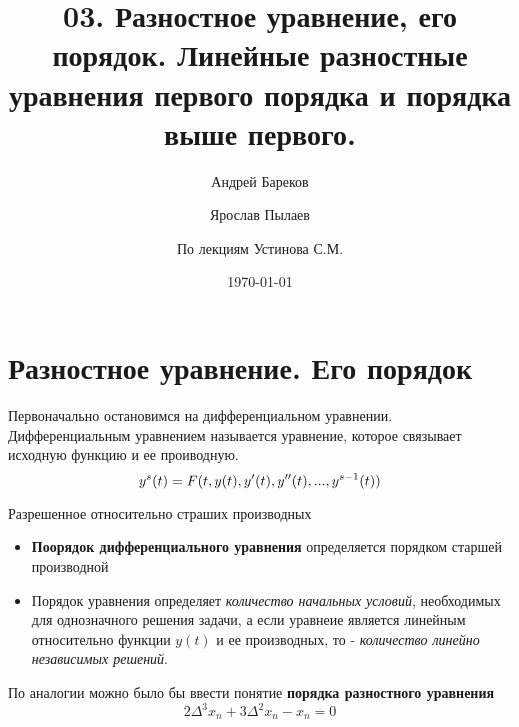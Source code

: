\documentclass[a4paper,11pt]{article}
\title{03. Разностное уравнение, его порядок. Линейные разностные уравнения первого порядка и порядка выше первого.}
\author{Андрей Бареков \and Ярослав Пылаев \and По лекциям Устинова С.М.}
\date{\today}
\begin{document}
\maketitle
\newpage

\section{Разностное уравнение. Его порядок}
  Первоначально остановимся на дифференциальном уравнении. Дифференциальным уравнением называется уравнение, которое связывает исходную функцию и ее проиводную.
  \begin{equation}
  y^{s}(t) = F(t, y(t), y'(t), y''(t), ..., y^{s-1}(t)) \\
  \end{equation}
  \begin{center}
  Разрешенное относительно страших производных
  \end{center}

  \begin{itemize}
    \item \textbf{Поорядок дифференциального уравнения} определяется порядком старшей производной
    \item Порядок уравнения определяет \textit{количество начальных условий}, необходимых для однозначного решения задачи, а если уравнеие является линейным относительно функции $y(t)$ и ее производных, то - \textit{количество линейно независимых решений}.
  \end{itemize}

  По аналогии можно было бы ввести понятие \textbf{порядка разностного уравнения}
  \begin{equation}
    2\Delta^3 x_n + 3\Delta^2 x_n - x_n = 0
    \label{eq:DiffEq}
  \end{equation}
\end{document}
